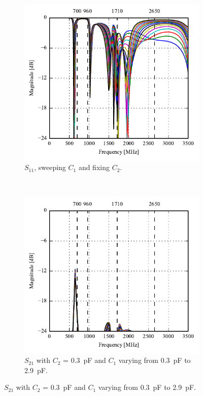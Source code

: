 \begin{figure}[htbp]
\begin{subfigure}[b]{0.49\linewidth}
        \includegraphics{img/tech_sol/monopole/play_mode/s22}
        \caption{$S_{11}$, sweeping $C_1$ and fixing $C_2$.}
        \label{fig:ant1_s22}
    \end{subfigure}
~
    \begin{subfigure}[b]{0.49\linewidth}
        \centering
        \includegraphics{img/tech_sol/monopole/play_mode/s21_s11}
        \caption{$S_{21}$ with $C_2$ = \SI{0.3}{pF} and $C_1$ varying from \SI{0.3}{pF} to \SI{2.9}{pF}.}

\end{subfigure}
\end{figure}
